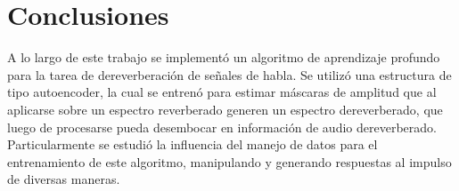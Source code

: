 \section{Conclusiones}
A lo largo de este trabajo se implementó un algoritmo de aprendizaje profundo para la tarea de dereverberación de señales de habla. Se utilizó una estructura de tipo autoencoder, la cual se entrenó para estimar máscaras de amplitud que al aplicarse sobre un espectro reverberado generen un espectro dereverberado, que luego de procesarse pueda desembocar en información de audio dereverberado. Particularmente se estudió la influencia del manejo de datos para el entrenamiento de este algoritmo, manipulando y generando respuestas al impulso de diversas maneras. 
